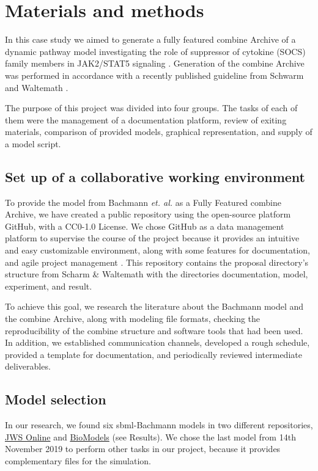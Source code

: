 \section*{Materials and methods} \label{matmet}

In this case study we aimed to generate a fully featured \ac{combine} Archive of a dynamic pathway model investigating the role of suppressor of cytokine (SOCS) family members in JAK2/STAT5 signaling \cite{bachmannmodel}. Generation of the \ac{combine} Archive was performed in accordance with a recently published guideline from Schwarm and Waltemath \cite{combine}.

The purpose of this project was divided into four groups. The tasks of each of them were the management of a documentation platform, review of exiting materials, comparison of provided models, graphical representation, and supply of a model script.

\subsection*{Set up of a collaborative working environment}
To provide the model from Bachmann \textit{et. al.}\cite{bachmannmodel} as a Fully Featured \ac{combine} Archive, we have created a public repository using the open-source platform GitHub, with a CC0-1.0 License. We chose GitHub as a data management platform to supervise the course of the project because it provides an intuitive and easy customizable environment, along with some features for documentation, and agile project management \cite{github}. This repository contains the proposal directory's structure from Scharm \& Waltemath \cite{combine} with the directories documentation, model, experiment, and result.

To achieve this goal, we research the literature about the Bachmann model and the \ac{combine} Archive, along with modeling file formats, checking the reproducibility of the \ac{combine} structure and software tools that had been used. In addition, we established communication channels, developed a rough schedule, provided a template for documentation, and periodically reviewed intermediate deliverables.

\subsection*{Model selection}
In our research, we found six \ac{sbml}-Bachmann models in two different repositories, \hyperlink{https://www.systemsmedicine.net/posts/jws-online-biological-systems-modelling}{JWS Online} and \hyperlink{https://www.ebi.ac.uk/biomodels/}{BioModels} (see Results). We chose the last model from 14th November 2019 to perform other tasks in our project, because it provides complementary files for the simulation.

